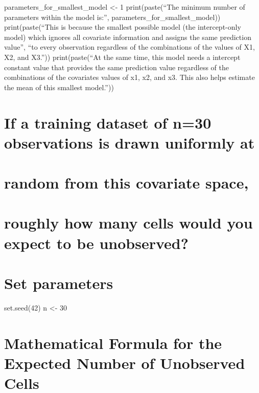 \documentclass[
  letterpaper,
  DIV=11,
  numbers=noendperiod]{scrreprt}
\begin{document}
parameters\_for\_smallest\_model \textless- 1 print(paste(``The minimum
number of parameters within the model is:'',
parameters\_for\_smallest\_model)) print(paste(``This is because the
smallest possible model (the intercept-only model) which ignores all
covariate information and assigns the same prediction value'', ``to
every observation regardless of the combinations of the values of X1,
X2, and X3.'')) print(paste(``At the same time, this model needs a
intercept constant value that provides the same prediction value
regardless of the combinations of the covariates values of x1, x2, and
x3. This also helps estimate the mean of this smallest model.''))


\chapter{If a training dataset of n=30 observations is drawn uniformly
at}\label{if-a-training-dataset-of-n30-observations-is-drawn-uniformly-at}


\chapter{random from this covariate
space,}\label{random-from-this-covariate-space}


\chapter{roughly how many cells would you expect to be
unobserved?}\label{roughly-how-many-cells-would-you-expect-to-be-unobserved}


\chapter{Set parameters}\label{set-parameters}

set.seed(42) n \textless- 30


\chapter{Mathematical Formula for the Expected Number of Unobserved
Cells}\label{mathematical-formula-for-the-expected-number-of-unobserved-cells}
\end{document}
